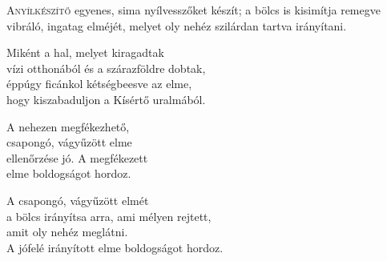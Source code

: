 
\vspace*{-\baselineskip}

\begin{firstdhpverse}[-0.5\baselineskip]{33}
\lettrine[slope=0.5em]{A}{nyílkészítő} {\LettrineTextFont egyenes,}\newline
sima nyílvesszőket készít;\newline
a bölcs is kisimítja\newline
remegve vibráló, ingatag elméjét,\newline
melyet oly nehéz szilárdan tartva irányítani.
\end{firstdhpverse}

\begin{dhpverse}

 Miként a hal, melyet kiragadtak\\
vízi otthonából és a szárazföldre dobtak,\\
éppúgy ficánkol kétségbeesve az elme,\\
hogy kiszabaduljon a Kísértő uralmából.

 A nehezen megfékezhető,\\
csapongó, vágyűzött elme\\
ellenőrzése jó. A megfékezett\\
elme boldogságot hordoz.

 A csapongó, vágyűzött elmét\\
a bölcs irányítsa arra, ami mélyen rejtett,\\
amit oly nehéz meglátni.\\
A jófelé irányított elme boldogságot hordoz.

\end{dhpverse}
\newpage
